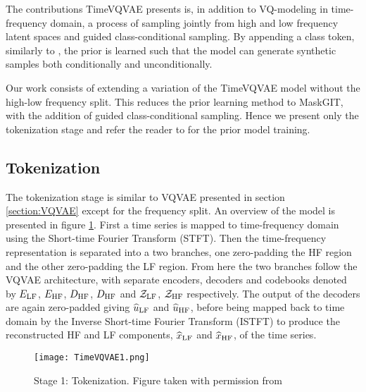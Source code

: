 \documentclass[../../thesis.tex]{subfiles}
\begin{document}
The contributions TimeVQVAE presents is, in addition to VQ-modeling in time-frequency domain, a process of sampling jointly from high and low frequency latent spaces and guided class-conditional sampling. By appending a class token, similarly to \cite{dosovitskiy2021image}, the prior is learned such that the model can generate synthetic samples both conditionally and unconditionally.\newline

Our work consists of extending a variation of the TimeVQVAE model without the high-low frequency split. This reduces the prior learning method to MaskGIT, with the addition of guided class-conditional sampling. Hence we present only the tokenization stage and refer the reader to \cite{VQVAE} for the prior model training. 

\subsection{Tokenization}

The tokenization stage is similar to VQVAE presented in section \ref{section:VQVAE} except for the frequency split. An overview of the model is presented in figure \ref{fig:TimeVQVAE1}. First a time series is mapped to time-frequency domain using the Short-time Fourier Transform (STFT). Then the time-frequency representation is separated into a two branches, one zero-padding the HF region and the other zero-padding the LF region. From here the two branches follow the VQVAE architecture, with separate encoders, decoders  and codebooks denoted by $E_{\mathrm{LF}}$, $E_{\mathrm{HF}}$, $D_{\mathrm{HF}}$, $D_{\mathrm{HF}}$ and $\mathcal{Z}_{\mathrm{LF}}$, $\mathcal{Z}_{\mathrm{HF}}$ respectively. The output of the decoders are again zero-padded giving $\widehat{u}_{\mathrm{LF}}$ and $\widehat{u}_{\mathrm{HF}}$, before being mapped back to time domain by the Inverse Short-time Fourier Transform (ISTFT) to produce the reconstructed HF and LF components, $\widehat{x}_{\mathrm{LF}}$ and $\widehat{x}_{\mathrm{HF}}$, of the time series. 

\begin{figure}[h]
    \texttt{[image: TimeVQVAE1.png]}
    \centering 
    \label{fig:TimeVQVAE1}
    \caption{Stage 1: Tokenization. Figure taken with permission from \cite{TimeVQVAE}}
\end{figure}
\end{document}
